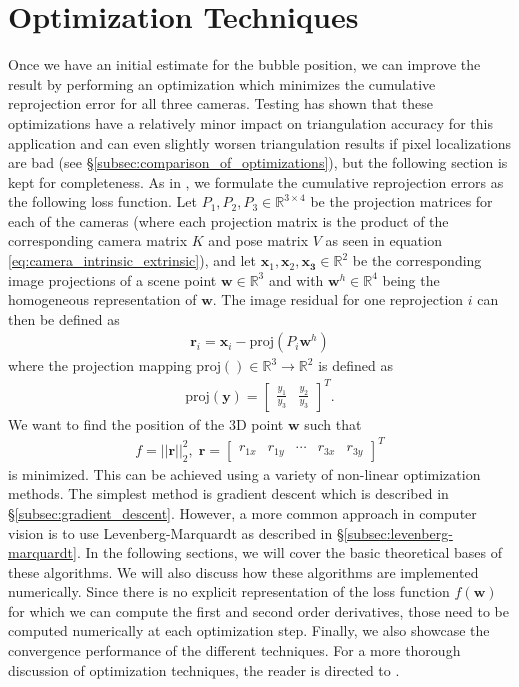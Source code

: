 \documentclass[11pt, letterpaper]{extarticle} %
\begin{document}
\section{Optimization Techniques} \label{sec:optimization_techniques}
Once we have an initial estimate for the bubble position, we can improve the result by performing an optimization which minimizes the cumulative reprojection error for all three cameras. Testing has shown that these optimizations have a relatively minor impact on triangulation accuracy for this application and can even slightly worsen triangulation results if pixel localizations are bad (see \S\ref{subsec:comparison_of_optimizations}), but the following section is kept for completeness. As in \cite{hedborg2014robust}, we formulate the cumulative reprojection errors as the following loss function. Let $P_1, P_2, P_3 \in \mathbb{R}^{3 \times 4}$ be the projection matrices for each of the cameras (where each projection matrix is the product of the corresponding camera matrix $K$ and pose matrix $V$ as seen in equation \ref{eq:camera_intrinsic_extrinsic}), and let $\mathbf{x}_1, \mathbf{x}_2, \mathbf{x_3} \in \mathbb{R}^{2}$ be the corresponding image projections of a scene point $\mathbf{w} \in \mathbb{R}^3$ and with $\mathbf{w}^h \in \mathbb{R}^4$ being the homogeneous representation of $\mathbf{w}$. The image residual for one reprojection $i$ can then be defined as
\begin{align}
    \mathbf{r}_i = \mathbf{x}_i - \mathrm{proj}(P_i \mathbf{w}^h)
\end{align}
where the projection mapping $\mathrm{proj}() \in \mathbb{R}^3 \rightarrow \mathbb{R}^2$ is defined as 
\begin{align}
    \mathrm{proj}(\mathbf{y}) = \begin{bmatrix} \frac{y_1}{y_3} & \frac{y_2}{y_3} \end{bmatrix}^T.
\end{align}
We want to find the position of the 3D point $\mathbf{w}$ such that 
\begin{align}
    f = ||\mathbf{r}||^2_2, \; \mathbf{r} = \begin{bmatrix} r_{1x} & r_{1y} & \cdots & r_{3x} & r_{3y} \end{bmatrix}^T
\end{align}
is minimized. This can be achieved using a variety of non-linear optimization methods. The simplest method is gradient descent which is described in \S\ref{subsec:gradient_descent}. However, a more common approach in computer vision is to use Levenberg-Marquardt as described in \S\ref{subsec:levenberg-marquardt}. In the following sections, we will cover the basic theoretical bases of these algorithms. We will also discuss how these algorithms are implemented numerically. Since there is no explicit representation of the loss function $f(\mathbf{w})$ for which we can compute the first and second order derivatives, those need to be computed numerically at each optimization step. Finally, we also showcase the convergence performance of the different techniques. For a more thorough discussion of optimization techniques, the reader is directed to \cite{madsen2004methods}. 
\end{document}
